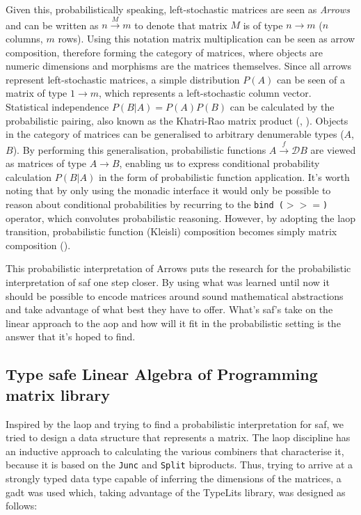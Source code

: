 \documentclass[
  oneside,
  11pt, a4paper,
  footinclude=true,
  headinclude=true,
  cleardoublepage=empty
]{scrbook}
\theoremstyle{definition}
\theoremstyle{definition}
\begin{document}
	        Given this, probabilistically speaking, left-stochastic matrices are seen as \emph{Arrows} and can be written as $n \xrightarrow{M} m$ to denote that matrix $M$ is of type $n \longrightarrow m$ ($n$ columns, $m$ rows). Using this notation matrix multiplication can be seen as arrow composition, therefore forming the category of matrices, where objects are numeric dimensions and morphisms are the matrices themselves. Since all arrows represent left-stochastic matrices, a simple distribution $P(A)$ can be seen of a matrix of type $1 \longrightarrow m$, which represents a left-stochastic column vector. Statistical independence $P(B|A) = P(A)P(B)$ can be calculated by the probabilistic pairing, also known as the Khatri-Rao matrix product (\cite{Macedo2012MatricesAA}, \cite{murta2013calculating}). Objects in the category of matrices can be generalised to arbitrary denumerable types ($A$, $B$). By performing this generalisation, probabilistic functions $A \xrightarrow{f} \mathscr{D}B$ are viewed as matrices of type $A \longrightarrow B$, enabling us to express conditional probability calculation $P(B|A)$ in the form of probabilistic function application. It's worth noting that by only using the monadic interface it would only be possible to reason about conditional probabilities by recurring to the \texttt{bind ($>>=$)} operator, which convolutes probabilistic reasoning. However, by adopting the \gls{laop} transition, probabilistic function (Kleisli) composition becomes simply matrix composition (\cite{oliveira2012towards}).
	        
	        This probabilistic interpretation of Arrows puts the research for the probabilistic interpretation of \gls{saf} one step closer. By using what was learned until now it should be possible to encode matrices around sound mathematical abstractions and take advantage of what best they have to offer. What's \gls{saf}'s take on the linear approach to the \gls{aop} and how will it fit in the probabilistic setting is the answer that it's hoped to find.
	    
	    \subsection{Type safe Linear Algebra of Programming matrix library}
	    
	    Inspired by the \gls{laop} and trying to find a probabilistic interpretation for \gls{saf}, we tried to design a data structure that represents a matrix. The \gls{laop} discipline has an inductive approach to calculating the various combiners that characterise it, because it is based on the \texttt{Junc} and \texttt{Split} biproducts. Thus, trying to arrive at a strongly typed data type capable of inferring the dimensions of the matrices, a \gls{gadt} was used which, taking advantage of the TypeLits library, was designed as follows:
	    
\end{document}
